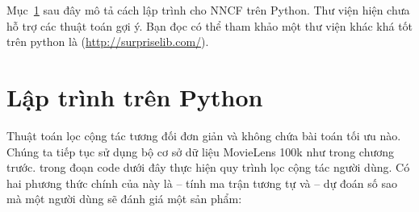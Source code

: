 Mục~\ref{sec:24_python} sau đây mô tả cách lập trình cho NNCF trên
Python. Thư viện  hiện chưa hỗ trợ các thuật toán gợi ý. Bạn đọc có thể tham khảo một thư viện khác khá tốt trên python là  (\url{http://surpriselib.com/}).

\section{Lập trình trên Python }
\label{sec:24_python}
Thuật toán lọc cộng tác tương đối đơn giản và không
chứa bài toán tối ưu nào. Chúng ta tiếp tục sử dụng bộ cơ sở dữ liệu MovieLens
100k như trong chương trước.  trong đoạn code dưới đây thực hiện quy trình lọc cộng tác người dùng. Có hai phương thức chính của
 này là  -- tính ma trận tương tự và
 -- dự đoán số sao mà một người dùng sẽ đánh giá một
sản phẩm:
\newpage
